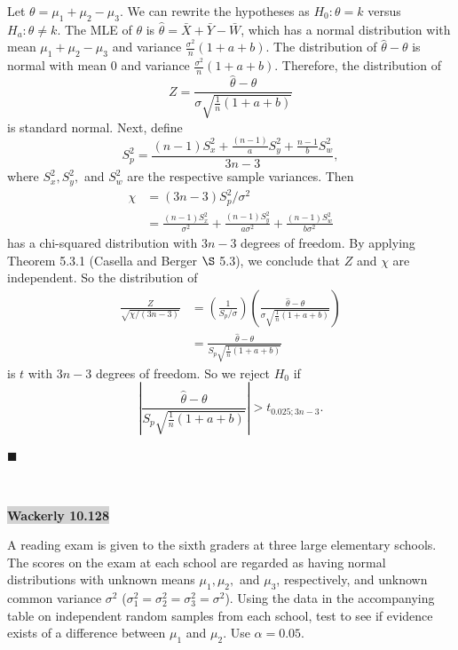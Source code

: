 \documentclass[12pt]{article}
\newcommand{\mybox}{%
    \collectbox{%
        \setlength{\fboxsep}{2pt}%
        \fbox{\BOXCONTENT}%
    }%
}
\begin{document}
\noindent Let $\theta = \mu_1 + \mu_2 - \mu_3$. We can rewrite the hypotheses as $H_0: \theta = k$ versus $H_a: \theta \neq k$. The MLE of $\theta$ is $\hat{\theta} = \bar{X} + \bar{Y} - \bar{W}$, which has a normal distribution with mean $\mu_1 + \mu_2 - \mu_3$ and variance $\frac{\sigma^2}{n}(1+a+b)$. The distribution of $\hat{\theta} - \theta$ is normal with mean $0$ and variance $\frac{\sigma^2}{n}(1+a+b)$. Therefore, the distribution of $$Z = \frac{\hat{\theta}-\theta}{\sigma\sqrt{\frac{1}{n}(1+a+b)}}$$ is standard normal. Next, define $$S_p^2 = \frac{(n-1)S_x^2 + \frac{(n-1)}{a}S_y^2+\frac{n-1}{b}S_w^2}{3n-3},$$ where $S_x^2, S_y^2,$ and $S_w^2$ are the respective sample variances. Then 
\begin{align}
\chi &= (3n-3)S_p^2/\sigma^2 \\
&= \frac{(n-1)S_x^2}{\sigma^2} + \frac{(n-1)S_y^2}{a\sigma^2} + \frac{(n-1)S_w^2}{b\sigma^2}
\end{align}
has a chi-squared distribution with $3n-3$ degrees of freedom. By applying Theorem 5.3.1 (Casella and Berger $\S$ 5.3), we conclude that $Z$ and $\chi$ are independent. So the distribution of 
\begin{align}
\frac{Z}{\sqrt{\chi/(3n-3)}} &= \left(\frac{1}{S_p/\sigma} \right)\left(\frac{\hat{\theta}-\theta}{\sigma\sqrt{\frac{1}{n}(1+a+b)}}\right) \\
&= \frac{\hat{\theta} - \theta}{S_p\sqrt{\frac{1}{n}(1+a+b)}}
\end{align}
is $t$ with $3n-3$ degrees of freedom. So we reject $H_0$ if $$\left|\frac{\hat{\theta} - \theta}{S_p\sqrt{\frac{1}{n}(1+a+b)}}\right| > t_{0.025; 3n-3}.$$

\hfill$\blacksquare$

\vfill
\begin{center}
\end{center}
\begin{center}
\vspace{-0.6cm}
\hrulefill \\
\vspace{-0.7cm}
\hrulefill
\end{center}

\pagebreak

\noindent\mybox{\colorbox{lightgray}{\textbf{Wackerly 10.128}}}\hspace{3mm}\hrulefill 

\noindent A reading exam is given to the sixth graders at three large elementary schools. The scores on the exam at each school are regarded as having normal distributions with unknown means $\mu_1, \mu_2,$ and $\mu_3$, respectively, and unknown common variance $\sigma^2$ ($\sigma_1^2 = \sigma_2^2 = \sigma_3^2 = \sigma^2$). Using the data in the accompanying table on independent random samples from each school, test to see if evidence exists of a difference between $\mu_1$ and $\mu_2$. Use $\alpha = 0.05$.
\end{document}
